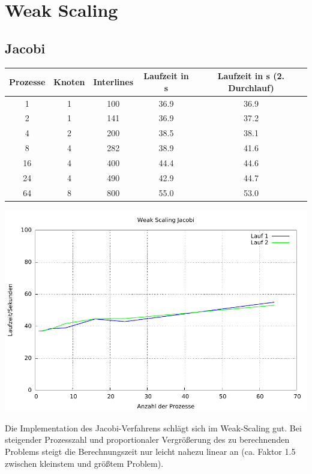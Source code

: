 \documentclass[a4paper]{article}
\begin{document}
\section{Weak Scaling}
\subsection{Jacobi}
\begin{tabular}{|c|c|c|c|c|}
\hline 
Prozesse & Knoten & Interlines & Laufzeit in s & Laufzeit in s (2. Durchlauf) \\ 
\hline 
1 & 1 & 100 & 36.9 & 36.9 \\ 
\hline 
2 & 1 & 141 & 36.9 & 37.2 \\ 
\hline 
4 & 2 & 200 & 38.5 & 38.1 \\ 
\hline 
8 & 4 & 282 & 38.9 & 41.6 \\ 
\hline 
16 & 4 & 400 & 44.4 & 44.6 \\ 
\hline 
24 & 4 & 490 & 42.9 & 44.7 \\ 
\hline 
64 & 8 & 800 & 55.0 & 53.0 \\ 
\hline 
\end{tabular} 

\includegraphics[scale=0.8]{img/WEAK_SCALING_JA_laufzeit.pdf}

Die Implementation des Jacobi-Verfahrens schlägt sich im Weak-Scaling gut. Bei steigender Prozesszahl und proportionaler Vergrößerung des zu berechnenden Problems steigt die Berechnungszeit nur leicht nahezu linear an (ca. Faktor 1.5 zwischen kleinstem und größtem Problem). 
\end{document}
